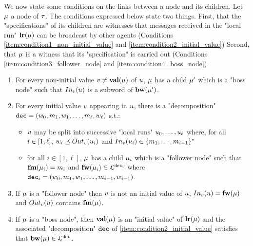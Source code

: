 We now state some conditions on the links between a node and its children.
Let $\mu$ a node of $\tau$. 
The conditions expressed below state two things. First, that the "specifications" of its children are witnesses that messages received in the "local run" $\mathbf{lr}(\mu)$ can be broadcast by other agents (Conditions \ref{item:condition1_non_initial_value} and \ref{item:condition2_initial_value})
Second, that $\mu$ is a witness that its "specification" is carried out (Conditions \ref{item:condition3_follower_node} and \ref{item:condition4_boss_node}).
\begin{enumerate}[{Condition} (i)]
	\item \label{item:condition1_non_initial_value} For every non-initial value $v \ne \mathbf{val}(\mu)$ of $u$, $\mu$ has a child $\mu'$ which is a "boss node" such that $\vinput{\aval}{\localrun}$ is a subword of $\mathbf{bw}(\mu')$.
	
	\item \label{item:condition2_initial_value} For every initial value $v$ appearing in $u$, there is a "decomposition" $\mathtt{dec} = (w_0, m_1, w_1, \ldots, m_{\ell}, w_{\ell})$ s.t.:
	\begin{itemize}
		\item $u$ may be split into successive "local runs" $u_0, \dots, u_{\ell}$ where, for all $i \in [1,\ell]$, $w_i \subword \voutput{\aval}{\localrun_i}$ and $\vinput{\aval}{\localrun_i} \in \set{m_1, \dots, m_{i-1}}^*$
		\item for all $i \in [1,\ell]$, $\mu$ has a child $\mu_i$ which is a "follower node" such that $\mathbf{fm}(\mu_i) = m_i$ and $\mathbf{fw}(\mu_i) \in\mathcal{L}^{\mathtt{\mathtt{dec}_i}}$ where $\mathtt{dec}_i = (w_0, m_1, w_1, \ldots, m_{i-1}, w_{i-1})$.	\end{itemize}
	
	\item \label{item:condition3_follower_node} If $\mu$ is a "follower node" then $v$ is not an initial value of $u$, $\vinput{\aval}{\localrun} = \followlabelword{\node}$ and 
	$\voutput{\aval}{\localrun}$ contains $\mathbf{fm}(\mu)$.

	\item \label{item:condition4_boss_node} If $\mu$ is a "boss node", then $\mathbf{val}(\mu)$ is an "initial value" of $\mathbf{lr}(\mu)$ and the associated "decomposition" $\mathtt{dec}$ of \ref{item:condition2_initial_value} satisfies that $\mathbf{bw}(\mu) \in \mathcal{L}^{\mathtt{\mathtt{dec}}}$.
\end{enumerate}

